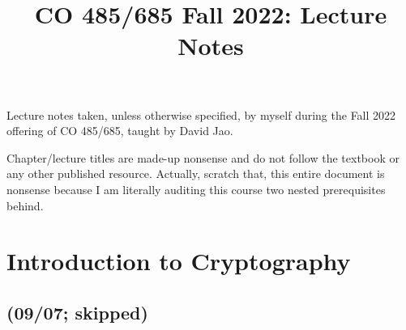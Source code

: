 \documentclass[notes]{agony}
\title{CO 485/685 Fall 2022: Lecture Notes}
\begin{document}
\renewcommand{\contentsname}{CO 485/685 Fall 2022:\\{\huge Lecture Notes}}
\thispagestyle{firstpage}
\tableofcontents

Lecture notes taken, unless otherwise specified,
by myself during the Fall 2022 offering of CO 485/685,
taught by David Jao.

Chapter/lecture titles are made-up nonsense and do not follow the textbook
or any other published resource.
Actually, scratch that, this entire document is nonsense because
I am literally auditing this course two nested prerequisites behind.

\chapter{Introduction to Cryptography}

\section{(09/07; skipped)}
\end{document}
